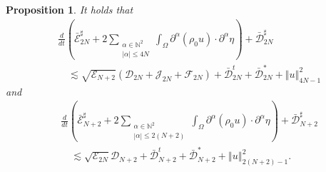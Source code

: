\documentclass[a4paper,reqno,11pt]{amsart}
\numberwithin{equation}{section}
\providecommand{\norm}[1]{\left\Vert#1\right\Vert}
\providecommand{\sd}[1]{\mathcal{D}_{#1}}
\providecommand{\se}[1]{\mathcal{E}_{#1}}
\providecommand{\norm}[1]{\left\Vert#1\right\Vert}
\newtheorem{prop}[lem]{Proposition}
\begin{document}
\begin{prop}\label{p_upper_evolution  N'132}
It holds that
\begin{equation}\label{p_u_e_00'132}
\begin{split}
&\frac{d}{dt}\left(\bar{\mathcal{E}}^\sharp_{2N}+2\sum_{\substack{{\alpha}\in \mathbb{N}^2\\  |{\alpha}|\le 4N}}\int_\Omega \partial^\alpha ( \rho_0   u )\cdot \partial^\alpha  \eta\right)+\bar{\mathcal{D}}_{2N}^\sharp
\\&\quad{\lesssim} \sqrt{ \se{N+2}  }( \sd{2N} + \mathcal{J}_{2N} +{\mathcal{F}_{2N}})+\bar{\mathcal{D}}_{2N}^t+\bar{\mathcal{D}}_{2N}^{\ast}+\norm{  u}_{4N-1}^2
\end{split}
\end{equation}
and
\begin{equation}\label{p_u_e_00'12132}
\begin{split}
&\frac{d}{dt}\left(\bar{\mathcal{E}}^\sharp_{N+2}+2\sum_{\substack{{\alpha}\in \mathbb{N}^2\\  |{\alpha}|\le 2(N+2)}}\int_\Omega \partial^\alpha ( \rho_0   u )\cdot \partial^\alpha  \eta\right)+\bar{\mathcal{D}}_{N+2}^\sharp
\\&\quad{\lesssim}\sqrt{ \se{2N}   } \sd{N+2} +\bar{\mathcal{D}}_{N+2}^t +\bar{\mathcal{D}}_{N+2}^{\ast}+\norm{  u}_{2(N+2)-1}^2.
\end{split}
\end{equation}
\end{prop}
\end{document}
